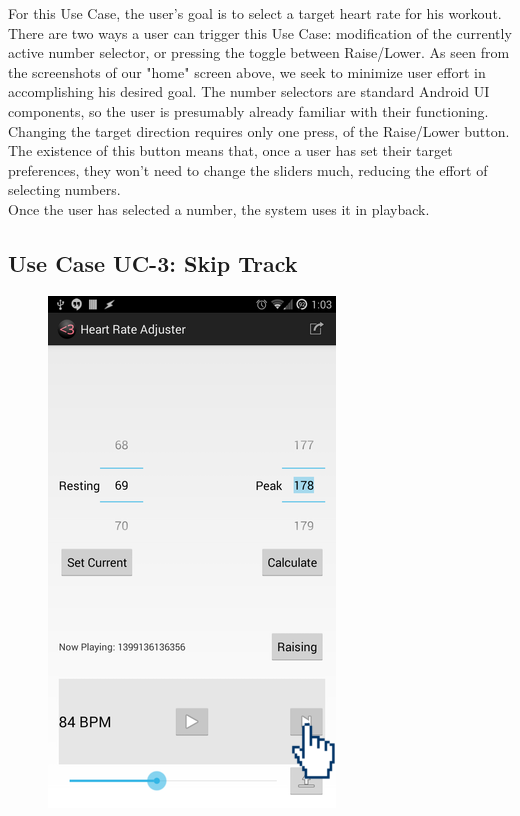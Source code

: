 \documentclass[letterpaper,english, 12pt]{scrreprt}
\begin{document}
For this Use Case, the user's goal is to select a target heart rate for his workout.
There are two ways a user can trigger this Use Case: modification of the currently active number selector, or pressing the toggle between Raise/Lower.
As seen from the screenshots of our "home" screen above, we seek to minimize user effort in accomplishing his desired goal.
The number selectors are standard Android UI components, so the user is presumably already familiar with their functioning.
Changing the target direction requires only one press, of the Raise/Lower button.
The existence of this button means that, once a user has set their target preferences, they won't need to change the sliders much, reducing the effort of selecting numbers.\\

Once the user has selected a number, the system uses it in playback.

\subsection{Use Case UC-3: Skip Track}

\begin{figure}[H]
	\centering
	\includegraphics{img/Prelim_Design/8.png}\\
\end{figure}
\end{document}

